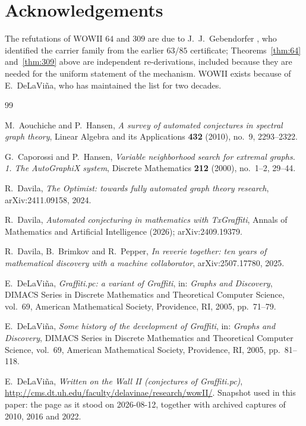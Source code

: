 \documentclass[10pt,a4paper]{article}
\theoremstyle{plain}
\theoremstyle{definition}
\begin{document}
\section*{Acknowledgements}

The refutations of WOWII $64$ and $309$ are due to J.~J.~Gebendorfer \cite{geb64,geb309}, who
identified the carrier family from the earlier $63$/$85$ certificate; Theorems~\ref{thm:64}
and~\ref{thm:309} above are independent re-derivations, included because they are needed for the
uniform statement of the mechanism. WOWII exists because of E.~DeLaVi\~na, who has maintained
the list for two decades.

\begin{thebibliography}{99}

M.~Aouchiche and P.~Hansen,
\emph{A survey of automated conjectures in spectral graph theory},
Linear Algebra and its Applications \textbf{432} (2010), no.~9, 2293--2322.

G.~Caporossi and P.~Hansen,
\emph{Variable neighborhood search for extremal graphs. 1. The AutoGraphiX system},
Discrete Mathematics \textbf{212} (2000), no.~1--2, 29--44.

R.~Davila,
\emph{The Optimist: towards fully automated graph theory research},
arXiv:2411.09158, 2024.

R.~Davila,
\emph{Automated conjecturing in mathematics with \emph{TxGraffiti}},
Annals of Mathematics and Artificial Intelligence (2026);
arXiv:2409.19379.

R.~Davila, B.~Brimkov and R.~Pepper,
\emph{In reverie together: ten years of mathematical discovery with a machine collaborator},
arXiv:2507.17780, 2025.

E.~DeLaVi\~na,
\emph{Graffiti.pc: a variant of Graffiti},
in: \emph{Graphs and Discovery}, DIMACS Series in Discrete Mathematics and Theoretical
Computer Science, vol.~69, American Mathematical Society, Providence, RI, 2005, pp.~71--79.

E.~DeLaVi\~na,
\emph{Some history of the development of Graffiti},
in: \emph{Graphs and Discovery}, DIMACS Series in Discrete Mathematics and Theoretical
Computer Science, vol.~69, American Mathematical Society, Providence, RI, 2005, pp.~81--118.

E.~DeLaVi\~na,
\emph{Written on the Wall II (conjectures of Graffiti.pc)},
\url{http://cms.dt.uh.edu/faculty/delavinae/research/wowII/}.
Snapshot used in this paper: the page as it stood on 2026-08-12, together with archived captures
of 2010, 2016 and 2022.


\end{thebibliography}
\end{document}
